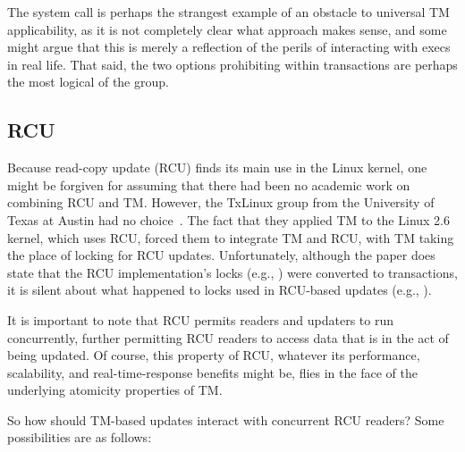 The  system call is perhaps the strangest example of an
obstacle to universal TM applicability, as it is not completely clear
what approach makes sense, and some might argue that this is merely a
reflection of the perils of interacting with execs in real life.
That said, the two options prohibiting  within transactions
are perhaps the most logical of the group.

\subsection{RCU}
\label{sec:future:RCU}

Because read-copy update (RCU) finds its main use in the Linux kernel,
one might be forgiven for assuming that there had been no academic work
on combining RCU and TM.
However, the TxLinux group from the University of Texas at Austin had
no choice~\cite{ChistopherJRossbach2007a}.
The fact that they applied TM to the Linux 2.6 kernel, which uses RCU,
forced them to integrate TM and RCU, with TM taking the place of locking
for RCU updates.
Unfortunately, although the paper does state that the RCU implementation's
locks (e.g., ) were converted to transactions,
it is silent about what happened to locks used in RCU-based updates
(e.g., ).

It is important to note that RCU permits readers and updaters to run
concurrently, further permitting RCU readers to access data that is in
the act of being updated.
Of course, this property of RCU, whatever its performance, scalability,
and real-time-response benefits might be, flies in the face of the
underlying atomicity properties of TM.

So how should TM-based updates interact with concurrent RCU readers?
Some possibilities are as follows:

